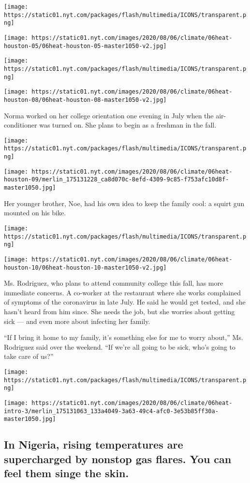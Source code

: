 \texttt{[image: https://static01.nyt.com/packages/flash/multimedia/ICONS/transparent.png]}

\texttt{[image: https://static01.nyt.com/images/2020/08/06/climate/06heat-houston-05/06heat-houston-05-master1050-v2.jpg]}

\texttt{[image: https://static01.nyt.com/packages/flash/multimedia/ICONS/transparent.png]}

\texttt{[image: https://static01.nyt.com/images/2020/08/06/climate/06heat-houston-08/06heat-houston-08-master1050-v2.jpg]}

Norma worked on her college orientation one evening in July when the
air-conditioner was turned on. She plans to begin as a freshman in the
fall.

\texttt{[image: https://static01.nyt.com/packages/flash/multimedia/ICONS/transparent.png]}

\texttt{[image: https://static01.nyt.com/images/2020/08/06/climate/06heat-houston-09/merlin\_175131228\_ca8d070c-8efd-4309-9c85-f753afc10d8f-master1050.jpg]}

Her younger brother, Noe, had his own idea to keep the family cool: a
squirt gun mounted on his bike.

\texttt{[image: https://static01.nyt.com/packages/flash/multimedia/ICONS/transparent.png]}

\texttt{[image: https://static01.nyt.com/images/2020/08/06/climate/06heat-houston-10/06heat-houston-10-master1050-v2.jpg]}

Ms. Rodriguez, who plans to attend community college this fall, has more
immediate concerns. A co-worker at the restaurant where she works
complained of symptoms of the coronavirus in late July. He said he would
get tested, and she hasn't heard from him since. She needs the job, but
she worries about getting sick --- and even more about infecting her
family.

``If I bring it home to my family, it's something else for me to worry
about,'' Ms. Rodriguez said over the weekend. ``If we're all going to be
sick, who's going to take care of us?''

\texttt{[image: https://static01.nyt.com/packages/flash/multimedia/ICONS/transparent.png]}

\texttt{[image: https://static01.nyt.com/images/2020/08/06/climate/06heat-intro-3/merlin\_175131063\_133a4049-3a63-49c4-afc0-3e53b85ff30a-master1050.jpg]}

\hypertarget{in-nigeria-rising-temperatures-are-supercharged-by-nonstop-gas-flares-you-can-feel-them-singe-the-skin}{%
\subsection{In Nigeria, rising temperatures are supercharged by nonstop
gas flares. You can feel them singe the
skin.}\label{in-nigeria-rising-temperatures-are-supercharged-by-nonstop-gas-flares-you-can-feel-them-singe-the-skin}}

